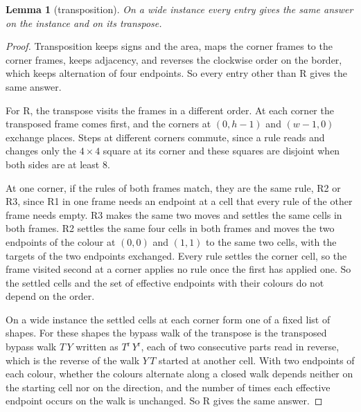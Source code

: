 \documentclass[11pt]{article}
\newtheorem{lemma}{Lemma}
\begin{document}
\begin{lemma}[transposition]\label{lem:trans}
On a wide instance every entry gives the same answer on the instance and on its transpose.
\end{lemma}
\begin{proof}
Transposition keeps signs and the area, maps the corner frames to the corner frames, keeps
adjacency, and reverses the clockwise order on the border, which keeps alternation of four
endpoints. So every entry other than R gives the same answer.

For R, the transpose visits the frames in a different order. At each corner the transposed frame
comes first, and the corners at $(0,h-1)$ and $(w-1,0)$ exchange places. Steps at different
corners commute, since a rule reads and changes only the $4\times 4$ square at its corner and
these squares are disjoint when both sides are at least $8$.

At one corner, if the rules of both frames match, they are the same rule, R2 or R3, since R1 in one
frame needs an endpoint at a cell that every rule of the other frame needs empty. R3 makes the same
two moves and settles the same cells in both frames. R2 settles the same four cells in both frames
and moves the two endpoints of the colour at $(0,0)$ and $(1,1)$ to the same two cells, with the
targets of the two endpoints exchanged. Every rule settles the corner cell, so the frame visited
second at a corner applies no rule once the first has applied one. So the settled cells and the
set of effective endpoints with their colours do not depend on the order.

On a wide instance the settled cells at each corner form one of a fixed list of shapes. For these
shapes the bypass walk of the transpose is the transposed bypass walk $T\,Y$ written as
$T^{\mathrm r}\,Y^{\mathrm r}$, each of two consecutive parts read in reverse, which is the reverse
of the walk $Y\,T$ started at another cell. With two endpoints of each colour, whether the colours
alternate along a closed walk depends neither on the starting cell nor on the direction, and the
number of times each effective endpoint occurs on the walk is unchanged. So R gives the same
answer.
\end{proof}
\end{document}
